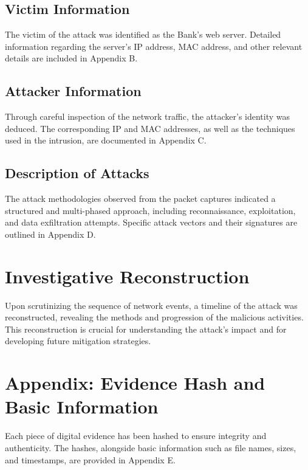 \documentclass{article}
\begin{document}
    \subsection{Victim Information}\label{subsec:victim-information}
    The victim of the attack was identified as the Bank's web server.
    Detailed information regarding the server's IP address, MAC address, and other relevant details are included in Appendix B.

    \subsection{Attacker Information}\label{subsec:attacker-information}
    Through careful inspection of the network traffic, the attacker's identity was deduced.
    The corresponding IP and MAC addresses, as well as the techniques used in the intrusion, are documented in Appendix C.

    \subsection{Description of Attacks}\label{subsec:description-of-attacks}
    The attack methodologies observed from the packet captures indicated a structured and multi-phased approach,
    including reconnaissance, exploitation, and data exfiltration attempts.
    Specific attack vectors and their signatures are outlined in Appendix D.


    \section{\fontsize{14pt}{17pt}\selectfont Investigative Reconstruction}\label{sec:selectfont-investigative-reconstruction}
    Upon scrutinizing the sequence of network events, a timeline of the attack was reconstructed,
    revealing the methods and progression of the malicious activities.
    This reconstruction is crucial for understanding the attack's impact and for developing future mitigation strategies.

    \section{\fontsize{14pt}{17pt}\selectfont Appendix: Evidence Hash and Basic Information}\label{sec:selectfont-appendix:-evidence-hash-and-basic-information}
    Each piece of digital evidence has been hashed to ensure integrity and authenticity.
    The hashes, alongside basic information such as file names, sizes, and timestamps, are provided in Appendix E.
\end{document}
